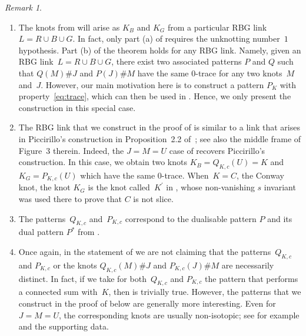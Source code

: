 \documentclass{amsart}
\let\cref\Cref
\newcommand{\pr}{^{\prime}}
\theoremstyle{remark}
\newtheorem{remark}[theorem]{Remark}
\begin{document}
\begin{remark}
\label{rmk:picc}
    \begin{enumerate}[label=(\alph*)]
        \item The knots from  will arise as $K_B$ and $K_G$ from a particular RBG link~$L = R \cup B \cup G$.
        In fact, only part (a) of  requires the unknotting number~$1$ 
        hypothesis. Part (b) of the theorem holds for any RBG link. Namely, given an RBG link~$L=R \cup B \cup G$, 
        there exist two associated patterns $P$ and $Q$ such that $Q(M)\# J$ and $P(J)\# M$ have the same $0$-trace for any two knots~$M$ and~$J$.
	    However, our main motivation here is to construct a pattern $P_K$ with property~\eqref{eq:trace},
	    which can then be used in \cref{cor:inf_order_pattern}.
	    Hence, we only present the construction in this special case.
        \item The RBG link that we construct in the proof of  is similar to a link that arises in Piccirillo's construction 
        in Proposition~2.2 of~\cite{piccirillo:Conway}; see also the middle frame of Figure~3 therein.
        Indeed, the $J=M=U$ case of  recovers Piccirillo's construction. In this case, we obtain two knots $K_B = Q_{K,c}(U)=K$ and~$K_G=P_{K,c}(U)$ which have the same $0$-trace. When~$K=C$, the Conway knot, the knot $K_G$ is the knot called~$K\pr$ in \cite{piccirillo:Conway}, 
        whose non-vanishing $s$ invariant was used there to prove that $C$ is not slice.
        \item The patterns~$Q_{K,c}$ and~$P_{K,c}$ correspond to the dualisable pattern $P$ and its dual pattern $P^\ast$ from \cite[Proposition~4.2]{piccirillo:shake-genus}. 
        \item Once again, in the statement of  we are not claiming that the patterns~$Q_{K,c}$ and $P_{K,c}$ or the knots $Q_{K,c}(M) \#J$ and $P_{K,c}(J) \# M$ are necessarily distinct. In fact, if we take for both~$Q_{K,c}$ and $P_{K,c}$ the pattern that performs a connected sum with~$K$, then  is trivially true. However, the patterns that we construct in the proof of  below are generally more interesting. Even for~$J=M=U$, the corresponding knots are usually non-isotopic; see for example \cite[Conjecture~5.5]{KS_exotic_traces} and the supporting data.
    \end{enumerate}
\end{remark}
\end{document}
